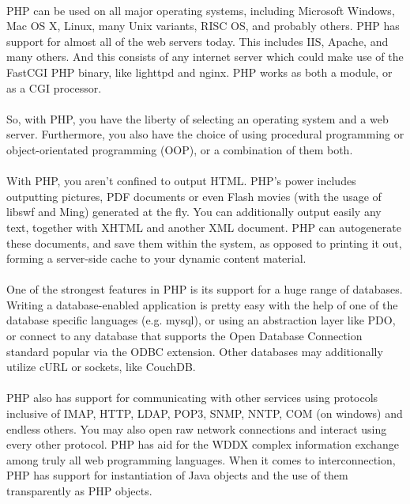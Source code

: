 \documentclass[../thesis.tex]{subfiles}
\begin{document}
\paragraph{}
PHP can be used on all major operating systems, including Microsoft Windows, Mac OS X, Linux, many Unix variants, RISC OS, and probably others. PHP has support for almost all of the web servers today. This includes IIS, Apache, and many others. And this consists of any internet server which could make use of the FastCGI PHP binary, like lighttpd and nginx. PHP works as both a module, or as a CGI processor.
\paragraph{}
So, with PHP, you have the liberty of selecting an operating system and a web server. Furthermore, you also have the choice of using procedural programming or object-orientated programming (OOP), or a combination of them both.
\paragraph{}
With PHP, you aren't confined to output HTML. PHP’s power includes outputting pictures, PDF documents or even Flash movies (with the usage of libswf and Ming) generated at the fly. You can additionally output easily any text, together with XHTML and another XML document. PHP can autogenerate these documents, and save them within the system, as opposed to printing it out, forming a server-side cache to your dynamic content material.
\paragraph{}
One of the strongest features in PHP is its support for a huge range of databases. Writing a database-enabled application is pretty easy with the help of one of the database specific languages (e.g. mysql), or using an abstraction layer like PDO, or connect to any database that supports the Open Database Connection standard popular via the ODBC extension. Other databases may additionally utilize cURL or sockets, like CouchDB.
\paragraph{}
PHP also has support for communicating with other services using protocols inclusive of IMAP, HTTP, LDAP, POP3, SNMP, NNTP, COM (on windows) and endless others. You may also open raw network connections and interact using every other protocol. PHP has aid for the WDDX complex information exchange among truly all web programming languages. When it comes to interconnection, PHP has support for instantiation of Java objects and the use of them transparently as PHP objects.
\end{document}
